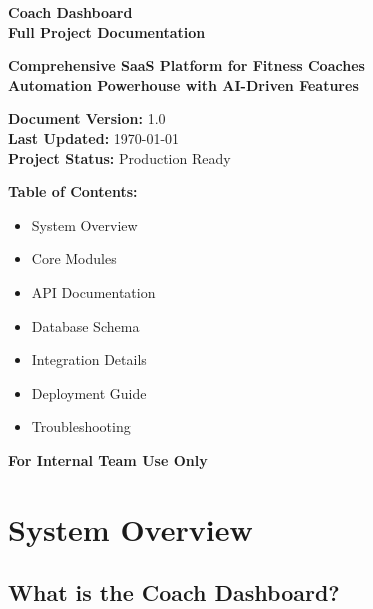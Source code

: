\documentclass[12pt,a4paper]{article}
\begin{document}
\begin{titlepage}
    \centering
    \vspace*{2cm}
    
    {\Huge\bfseries\color{blue} Coach Dashboard}\\[0.5cm]
    {\Large\bfseries Full Project Documentation}\\[1cm]
    
    \vspace{1cm}
    
    {\large\textbf{Comprehensive SaaS Platform for Fitness Coaches}}\\[0.5cm]
    {\large\textbf{Automation Powerhouse with AI-Driven Features}}\\[1cm]
    
    \vspace{2cm}
    
    {\large\textbf{Document Version:} 1.0}\\[0.5cm]
    {\large\textbf{Last Updated:} \today}\\[0.5cm]
    {\large\textbf{Project Status:} Production Ready}\\[1cm]
    
    \vspace{2cm}
    
    {\large\textbf{Table of Contents:}}\\[0.5cm]
    \begin{itemize}[leftmargin=2cm]
        \item System Overview
        \item Core Modules
        \item API Documentation
        \item Database Schema
        \item Integration Details
        \item Deployment Guide
        \item Troubleshooting
    \end{itemize}
    
    \vfill
    
    {\large\textbf{For Internal Team Use Only}}
\end{titlepage}

\tableofcontents
\newpage

\section{System Overview}

\subsection{What is the Coach Dashboard?}
\end{document}
